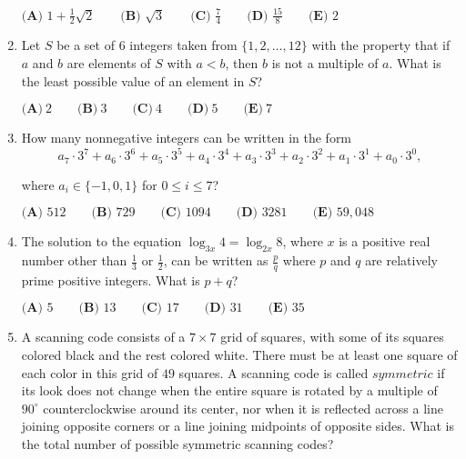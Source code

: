 \documentclass{article}
\begin{document}
\begin{enumerate}[label=\arabic*., itemsep=0.5em]
\(\textbf{(A) }   1+\frac12 \sqrt2   \qquad        \textbf{(B) }   \sqrt3   \qquad    \textbf{(C) }   \frac74   \qquad   \textbf{(D) }  \frac{15}{8} \qquad  \textbf{(E) }   2 \)\par \vspace{0.5em}\item Let \(S\) be a set of \(6\) integers taken from \(\{1,2,\dots,12\}\) with the property that if \(a\) and \(b\) are elements of \(S\) with \(a<b\), then \(b\) is not a multiple of \(a\). What is the least possible value of an element in \(S\)?

\(\textbf{(A)}\ 2\qquad\textbf{(B)}\ 3\qquad\textbf{(C)}\ 4\qquad\textbf{(D)}\ 5\qquad\textbf{(E)}\ 7\)\par \vspace{0.5em}\item How many nonnegative integers can be written in the form 
\begin{equation*}
a_7\cdot3^7+a_6\cdot3^6+a_5\cdot3^5+a_4\cdot3^4+a_3\cdot3^3+a_2\cdot3^2+a_1\cdot3^1+a_0\cdot3^0,
\end{equation*}

where \(a_i\in \{-1,0,1\}\) for \(0\le i \le 7\)?

\(\textbf{(A) } 512 \qquad 
\textbf{(B) } 729 \qquad 
\textbf{(C) } 1094 \qquad 
\textbf{(D) } 3281 \qquad 
\textbf{(E) } 59,048 \)\par \vspace{0.5em}\item The solution to the equation \(\log_{3x} 4 = \log_{2x} 8\), where \(x\) is a positive real number other than \(\frac{1}{3}\) or \(\frac{1}{2}\), can be written as \(\frac {p}{q}\) where \(p\) and \(q\) are relatively prime positive integers. What is \(p + q\)?

\(\textbf{(A) } 5   \qquad    
\textbf{(B) } 13   \qquad    
\textbf{(C) } 17   \qquad   
\textbf{(D) } 31 \qquad  
\textbf{(E) } 35 \)\par \vspace{0.5em}\item A scanning code consists of a \(7 \times 7\) grid of squares, with some of its squares colored black and the rest colored white. There must be at least one square of each color in this grid of \(49\) squares. A scanning code is called \(\textit{symmetric}\) if its look does not change when the entire square is rotated by a multiple of \(90 ^{\circ}\) counterclockwise around its center, nor when it is reflected across a line joining opposite corners or a line joining midpoints of opposite sides. What is the total number of possible symmetric scanning codes?


\end{enumerate}
\end{document}
